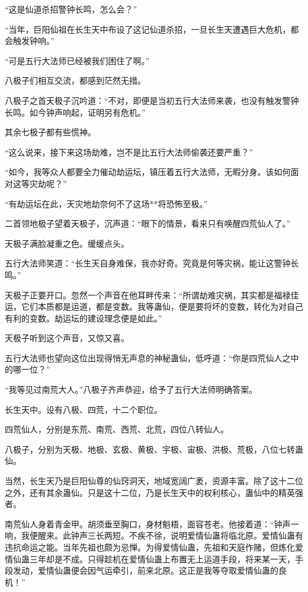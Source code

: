\begin{this_body}
“这是仙道杀招警钟长鸣，怎么会？”

“当年，巨阳仙祖在长生天中布设了这记仙道杀招，一旦长生天遭遇巨大危机，都会触发钟响。”

“可是五行大法师已经被我们困住了啊。”

八极子们相互交流，都感到茫然无措。

八极子之首天极子沉吟道：“不对，即便是当初五行大法师来袭，也没有触发警钟长鸣。如今钟声响起，证明另有危机。”

其余七极子都有些慌神。

“这么说来，接下来这场劫难，岂不是比五行大法师偷袭还要严重？”

“如今，我等众人都要全力催动劫运坛，镇压着五行大法师，无暇分身。该如何面对这等灾劫呢？”

“有劫运坛在此，天灾地劫奈何不了这场**将恐怖至极。”

二首领地极子望着天极子，沉声道：“眼下的情景，看来只有唤醒四荒仙人了。”

天极子满脸凝重之色。缓缓点头。

五行大法师笑道：“长生天自身难保，我亦好奇。究竟是何等灾祸，能让这警钟长鸣。”

天极子正要开口。忽然一个声音在他耳畔传来：“所谓劫难灾祸，其实都是福禄佳运，它们本质都是运道，都是变数。我等蛊仙，便是要将坏的变数，转化为对自己有利的变数。劫运坛的建设理念便是如此。”

天极子听到这个声音，又惊又喜。

五行大法师也望向这位出现得悄无声息的神秘蛊仙，低呼道：“你是四荒仙人之中的哪一位？”

“我等见过南荒大人。”八极子齐声恭迎，给予了五行大法师明确答案。

长生天中。设有八极、四荒，十二个职位。

四荒仙人，分别是东荒、南荒、西荒、北荒，四位八转仙人。

八极子，分别为天极、地极、玄极、黄极、宇极、宙极、洪极、荒极，八位七转蛊仙。

当然，长生天乃是巨阳仙尊的仙窍洞天，地域宽阔广袤，资源丰富。除了这十二位之外，还有其余蛊仙。只是这十二位，乃是长生天中的权利核心，蛊仙中的精英强者。

南荒仙人身着青金甲。胡须垂至胸口，身材魁梧，面容苍老。他接着道：“钟声一响，我便醒来。此钟声三长两短。不疾不徐，说明爱情仙蛊将临北原。爱情仙蛊有违抗命运之能。当年先祖也颇为忌惮。为得爱情仙蛊，先祖和天庭作赌，但炼化爱情仙蛊三年却是不成。只得趁机在爱情仙蛊上布置无上运道手段，将来某一天，手段发动，爱情仙蛊便会因气运牵引，前来北原。这正是我等夺取爱情仙蛊的良机！”


\end{this_body}
